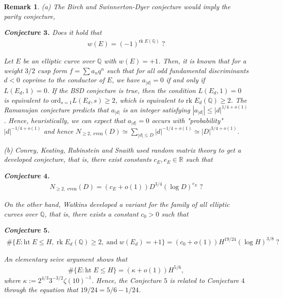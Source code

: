 \documentclass[12pt,reqno]{amsart}
\def\R {{\mathbb R}} \def\RR {{\mathbb R}}
\newtheorem{remark}[thm]{Remark}
\numberwithin{equation}{section}
\def\RR{{\mathbb R}}
\def\R{{\mathbb R}}
\def\Q{{\mathbb Q}}
\begin{document}
\begin{remark}
{\rm
(a) The Birch and Swinnerton-Dyer conjecture would imply the parity conjecture,

\smallskip

{\bf Conjecture $\mathbf{3}$.} Does it hold that
\begin{align*}
w(E) = (-1)^{\text{rk} \; E(\Q)} \; ?
\end{align*}

\smallskip

Let $E$ be an elliptic curve over $\Q$ with $w(E) = +1$. Then, it is known that for a weight $3/2$ cusp form $f = \sum a_nq^n$ such that for all odd fundamental discriminants $d<0$ coprime to the conductor of $E$, we have $a_{|d|} = 0$ if and only if $L(E_d, 1) = 0$. If the BSD conjecture is true, then the condition $L(E_d,1)=0$ is equivalent to $\text{ord}_{s=1} L(E_d, s) \ge 2$, which is equivalent to $\text{rk} \; E_d(\Q) \ge 2$. The Ramanujan conjecture predicts that $a_|d|$ is an integer satisfying $|a_|d|| \le |d|^{1/4 + o(1)}$. Hence, heuristically, we can expect that $a_|d| = 0$ occurs with "probability" $|d|^{-1/4+o(1)}$ and hence $N_{\ge 2, \; \text{even}}(D)  \simeq \sum_{|d| \le D} |d|^{-1/4+o(1)} \simeq |D|^{3/4 + o(1)}$.

\smallskip

(b) Conrey, Keating, Rubinstein and Snaith used random matrix theory to get a developed conjecture, that is, there exist constants $c_E, e_E \in \R$ such that

\smallskip
{\bf Conjecture $\mathbf{4}$.}
\begin{align*}
N_{\ge 2, \; \text{even}}(D) = (c_E + o(1))D^{3/4} (\log D)^{e_E}\; ?
\end{align*}

On the other hand, Watkins developed a variant for the family of all elliptic curves over $\Q$, that is, there exists a constant $c_0>0$ such that

\smallskip
{\bf Conjecture $\mathbf{5}$.}
\begin{align*}
\# \{E: \text{ht} \; E \le H, \; \text{rk} \; E_d(\Q) \ge 2, \;\text{and} \; w(E_d) = +1 \} =  (c_0 + o(1)) H^{19/24} (\log H)^{3/8}\; ?
\end{align*}

\smallskip

An elementary seive argument shows that 
\begin{align*}
\# \{E: \text{ht} \; E \le H\} = (\kappa + o(1))H^{5/6},
\end{align*}
where $\kappa:=2^{4/3}3^{-3/2} \zeta(10)^{-1}$. Hence, the Conjecture $5$ is related to Conjecture $4$ through the equation that $19/24 = 5/6 - 1/24$.

}
\end{remark}
\end{document}
